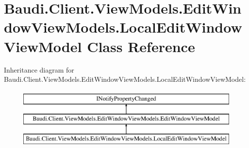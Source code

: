 \hypertarget{class_baudi_1_1_client_1_1_view_models_1_1_edit_window_view_models_1_1_local_edit_window_view_model}{}\section{Baudi.\+Client.\+View\+Models.\+Edit\+Window\+View\+Models.\+Local\+Edit\+Window\+View\+Model Class Reference}
\label{class_baudi_1_1_client_1_1_view_models_1_1_edit_window_view_models_1_1_local_edit_window_view_model}
Inheritance diagram for Baudi.\+Client.\+View\+Models.\+Edit\+Window\+View\+Models.\+Local\+Edit\+Window\+View\+Model\+:\begin{figure}[H]
\begin{center}
\leavevmode
\includegraphics[height=3.000000cm]{class_baudi_1_1_client_1_1_view_models_1_1_edit_window_view_models_1_1_local_edit_window_view_model}
\end{center}
\end{figure}
